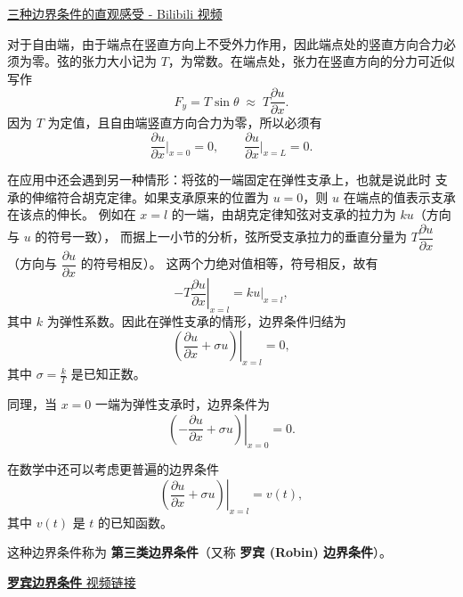 \href{https://www.bilibili.com/video/BV1sEpCzzEWr?vd_source=aa3cbf11c6c44a57861db6554a266722}{三种边界条件的直观感受 - Bilibili 视频}
\begin{dxtips}
    对于自由端，由于端点在竖直方向上不受外力作用，因此端点处的竖直方向合力必须为零。弦的张力大小记为 $T$，为常数。在端点处，张力在竖直方向的分力可近似写作
\[
F_y = T \sin \theta \;\approx\; T \frac{\partial u}{\partial x}.
\]
因为 $T$ 为定值，且自由端竖直方向合力为零，所以必须有
\[
\frac{\partial u}{\partial x}\Big|_{x=0} = 0,
\qquad
\frac{\partial u}{\partial x}\Big|_{x=L} = 0.
\]
\end{dxtips}
\begin{definition}[第三类边界条件]
在应用中还会遇到另一种情形：将弦的一端固定在弹性支承上，也就是说此时
支承的伸缩符合胡克定律。如果支承原来的位置为 $u=0$，则 $u$ 在端点的值表示支承在该点的伸长。
例如在 $x=l$ 的一端，由胡克定律知弦对支承的拉力为 $ku$（方向与 $u$ 的符号一致），
而据上一小节的分析，弦所受支承拉力的垂直分量为 $T\dfrac{\partial u}{\partial x}$（方向与 $\dfrac{\partial u}{\partial x}$ 的符号相反）。
这两个力绝对值相等，符号相反，故有
\[
  -T \left.\frac{\partial u}{\partial x}\right|_{x=l} = k \left.u\right|_{x=l},
\]
其中 $k$ 为弹性系数。因此在弹性支承的情形，边界条件归结为
\[
  \left.\left(\frac{\partial u}{\partial x} + \sigma u\right)\right|_{x=l} = 0,
\]
其中 $\sigma = \tfrac{k}{T}$ 是已知正数。

同理，当 $x=0$ 一端为弹性支承时，边界条件为
\[
  \left.\left(-\frac{\partial u}{\partial x} + \sigma u\right)\right|_{x=0} = 0.
\]

在数学中还可以考虑更普遍的边界条件
\[
  \left.\left(\frac{\partial u}{\partial x} + \sigma u\right)\right|_{x=l} = v(t),
\]
其中 $v(t)$ 是 $t$ 的已知函数。

这种边界条件称为 \textbf{第三类边界条件}（又称 \textbf{罗宾 (Robin) 边界条件}）。
\end{definition}
\href{https://www.bilibili.com/video/BV1rDpvzyEt8?vd_source=aa3cbf11c6c44a57861db6554a266722}{\textbf{罗宾边界条件} 视频链接}


